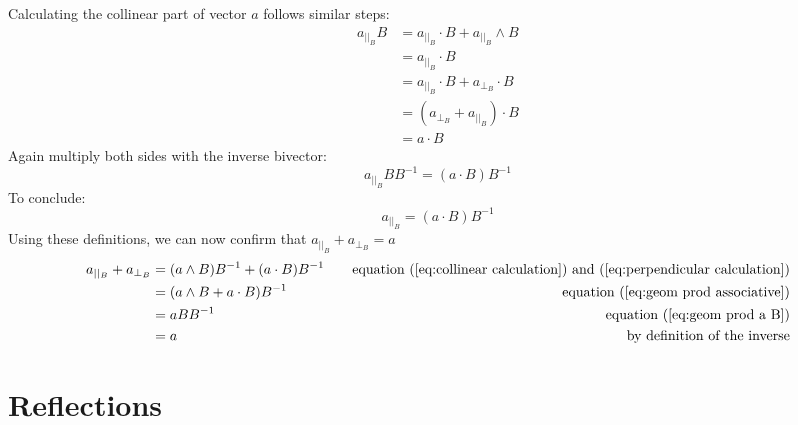 \documentclass[10pt]{report}
\begin{document}
Calculating the collinear part of vector $a$ follows similar
steps:
\begin{align}
        a_{||_{B}}B &= a_{||_{B}}\cdot B + a_{||_{B}}\wedge B \nonumber \\
                    &= a_{||_{B}}\cdot B \nonumber \\
                    &= a_{||_{B}}\cdot B + a_{\bot_{B}}\cdot B \nonumber \\
                    &= (a_{\bot_{B}} + a_{||_{B}})\cdot B \nonumber \\
                    &= a\cdot B \nonumber
\end{align}
Again multiply both sides with the inverse bivector:
\begin{displaymath}
       a_{||_{B}}BB^{-1} = (a\cdot B)B^{-1}
\end{displaymath}
To conclude:
\begin{equation}
        a_{||_{B}} = (a\cdot B)B^{-1} \label{eq:collinear calculation}
\end{equation}
Using these definitions, we can now confirm that $a_{||_B} +
a_{\bot_B} = a$
\begin{align}
        a_{||_{B}} + a_{\bot_{B}} &= (a\wedge B)B^{-1} + (a\cdot B)B^{-1} &&&\text{equation (\ref{eq:collinear calculation}) and (\ref{eq:perpendicular calculation})} \nonumber \\
        &= (a\wedge B + a\cdot B)B^{-1} &&&\text{equation (\ref{eq:geom prod associative})} \nonumber \\
        &= aBB^{-1} &&&\text{equation (\ref{eq:geom prod a B})} \nonumber \\
        &= a &&&\text{by definition of the inverse} \nonumber
\end{align}

\newpage
\section{Reflections}
\end{document}
